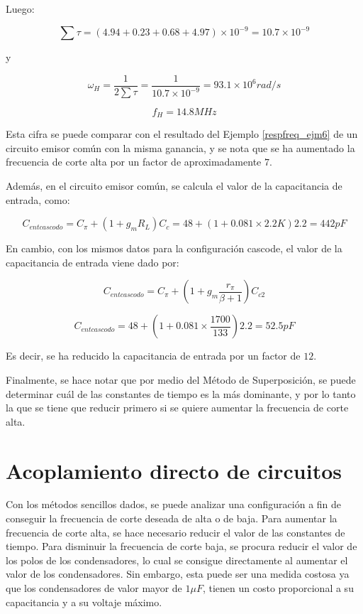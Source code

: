 Luego:

\[
\sum \tau = (4.94 + 0.23 + 0.68 + 4.97) \times 10^{-9} = 10.7 \times 10^{-9}
\]

y 

\[
\omega_H = \frac{1}{2\sum \tau} = \frac{1}{10.7 \times 10^{-9}} = 93.1 \times 10^6 rad/s
\]

\[
f_H = 14.8 MHz
\]

Esta cifra se puede comparar con el resultado del Ejemplo \ref{respfreq_ejm6} de un circuito emisor común con la misma ganancia, y se nota que se ha aumentado la frecuencia de corte alta por un factor de aproximadamente \( 7 \).

Además, en el circuito emisor común, se calcula el valor de la capacitancia de entrada, como:

\[
C_{entcascodo} = C_{\pi} + (1 + g_m R_L) C_c = 48 + (1 + 0.081 \times 2.2K) 2.2 = 442 pF
\]

En cambio, con los mismos datos para la configuración cascode, el valor de la capacitancia de entrada viene dado por:

\[
C_{entcascodo} = C_{\pi} + \left( 1 + g_m \frac{r_{\pi}}{\beta + 1} \right) C_{c2}
\]

\[
C_{entcascodo} = 48 + \left( 1 + 0.081 \times \frac{1700}{133} \right) 2.2 = 52.5 pF
\]

Es decir, se ha reducido la capacitancia de entrada por un factor de \( 12 \).

Finalmente, se hace notar que por medio del Método de Superposición, se puede determinar cuál de las constantes de tiempo es la más dominante, y por lo tanto la que se tiene que reducir primero si se quiere aumentar la frecuencia de corte alta.

\section{Acoplamiento directo de circuitos} %

Con los métodos sencillos dados, se puede analizar una configuración a fin de conseguir la frecuencia de corte deseada de alta o de baja. Para aumentar la frecuencia de corte alta, se hace necesario reducir el valor de las constantes de tiempo. Para disminuir la frecuencia de corte baja, se procura reducir el valor de los polos de los condensadores, lo cual se consigue directamente al aumentar el valor de los condensadores. Sin embargo, esta puede ser una medida costosa ya que los condensadores de valor mayor de $1 \mu F$, tienen un costo proporcional a su capacitancia y a su voltaje máximo.

